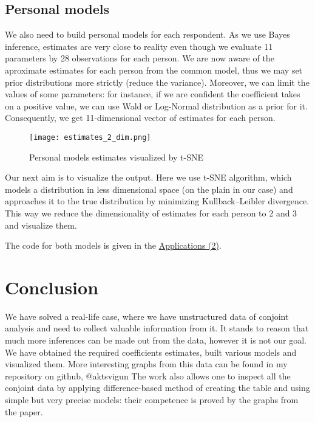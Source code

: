 \documentclass[a4paper, 12pt]{extreport}
\begin{document}
\subsection{Personal models}
We also need to build personal models for each respondent. As we use Bayes inference, estimates are very close to reality even though we evaluate 11 parameters by 28 observations for each person. We are now aware of
the aproximate estimates for each person from the common model, thus we may set prior distributions more strictly (reduce the variance). Moreover, we can limit the values of some parameters: for instance, if we are
confident the coefficient takes on a positive value, we can use Wald or Log-Normal distribution as a prior for it. Consequently, we get 11-dimensional vector of estimates for each person.

\begin{figure}
  \texttt{[image: estimates\_2\_dim.png]}
  \caption{Personal models estimates visualized by t-SNE}
\end{figure}

Our next aim is to visualize the output. Here we use t-SNE algorithm, which models a distribution in less dimensional space (on the plain in our case) and approaches it to the true distribution by minimizing
Kullback–Leibler divergence. This way we reduce the dimensionality of estimates for each person to 2 and 3 and visualize them. %

The code for both models is given in the \hyperref[app_2]{Applications (2)}.

\section{Conclusion}
We have solved a real-life case, where we have unstructured data of conjoint analysis and need to collect valuable information from it. It stands to reason that much more inferences can be made out from the data, however
it is not our goal. We have obtained the required coefficients estimates, built various models and visualized them. More interesting graphs from this data can be found in my repository on github, @aktsvigun %
The work also allows one to inspect all the conjoint data by applying difference-based method of creating the table and using simple but very precise models: their competence is proved by the graphs from the paper.

\end{document}
